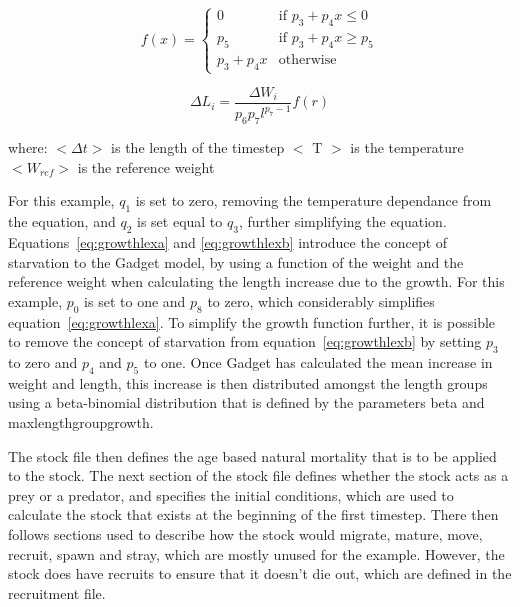 \documentclass[10pt,twoside]{article}
\begin{document}
\begin{equation}\label{eq:growthlexb}
f(x) =
\begin{cases}
0 & \textrm{if $p_{3} + p_{4}x \leq 0$} \\
p_{5} & \textrm{if $p_{3} + p_{4}x \geq p_{5}$} \\
p_{3} + p_{4}x & \textrm{otherwise}
\end{cases}
\end{equation}

\begin{equation}\label{eq:growthlexc}
\Delta L_i = \frac{\Delta W_i} {p_{6} p_{7} l^{p_{7} - 1}} f(r)
\end{equation}

where:\newline
$<\Delta t>$ is the length of the timestep\newline
$<$ T $>$ is the temperature\newline
$<W_{ref}>$ is the reference weight

\bigskip
For this example, $q_1$ is set to zero, removing the temperature dependance from the equation, and $q_2$ is set equal to $q_3$, further simplifying the equation.  Equations~\ref{eq:growthlexa} and \ref{eq:growthlexb} introduce the concept of starvation to the Gadget model, by using a function of the weight and the reference weight when calculating the length increase due to the growth.  For this example, $p_0$ is set to one and $p_8$ to zero, which considerably simplifies equation~\ref{eq:growthlexa}.  To simplify the growth function further, it is possible to remove the concept of starvation from equation~\ref{eq:growthlexb} by setting $p_3$ to zero and $p_4$ and $p_5$ to one.  Once Gadget has calculated the mean increase in weight and length, this increase is then distributed amongst the length groups using a beta-binomial distribution that is defined by the parameters beta and maxlengthgroupgrowth.

\bigskip
The stock file then defines the age based natural mortality that is to be applied to the stock.  The next section of the stock file defines whether the stock acts as a prey or a predator, and specifies the initial conditions, which are used to calculate the stock that exists at the beginning of the first timestep.  There then follows sections used to describe how the stock would migrate, mature, move, recruit, spawn and stray, which are mostly unused for the example.  However, the stock does have recruits to ensure that it doesn't die out, which are defined in the recruitment file.
\end{document}
